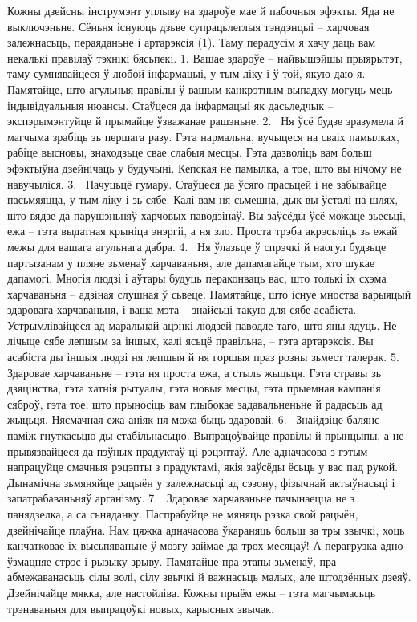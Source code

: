 Кожны дзейсны інструмэнт уплыву на здароўе мае й пабочныя эфэкты. Яда не выключэньне. Сёньня існуюць дзьве супрацьлеглыя тэндэнцыі – харчовая залежнасьць, пераяданьне і артарэксія (1). 
Таму перадусім я хачу даць вам некалькі правілаў тэхнікі бясьпекі.
1. Вашае здароўе – найвышэйшы прыярытэт, таму сумнявайцеся ў любой інфармацыі, у тым ліку і ў той, якую даю я. Памятайце, што агульныя правілы ў вашым канкрэтным выпадку могуць мець індывідуальныя нюансы. Стаўцеся да інфармацыі як дасьледчык – экспэрымэнтуйце й прымайце ўзважанае рашэньне.
2.  Ня ўсё будзе зразумела й магчыма зрабіць зь першага разу. Гэта нармальна, вучыцеся на сваіх памылках, рабіце высновы, знаходзьце свае слабыя месцы. Гэта дазволіць вам больш эфэктыўна дзейнічаць у будучыні. Кепская не памылка, а тое, што вы нічому не навучыліся.
3.  Пачуцьцё гумару. Стаўцеся да ўсяго прасьцей і не забывайце пасьмяяцца, у тым ліку і зь сябе. Калі вам ня сьмешна, дык вы ўсталі на шлях, што вядзе да парушэньняў харчовых паводзінаў. Вы заўсёды ўсё можаце зьесьці, ежа – гэта выдатная крыніца энэргіі, а ня зло. Проста трэба акрэсьліць зь ежай межы для вашага агульнага дабра.
4.  Ня ўлазьце ў спрэчкі й наогул будзьце партызанам у пляне зьменаў харчаваньня, але дапамагайце тым, хто шукае дапамогі. Многія людзі і аўтары будуць пераконваць вас, што толькі іх схэма харчаваньня – адзіная слушная ў сьвеце. Памятайце, што існуе мноства варыяцый здаровага харчаваньня, і ваша мэта – знайсьці такую для сябе асабіста. Устрымлівайцеся ад маральнай ацэнкі людзей паводле таго, што яны ядуць. Не лічыце сябе лепшым за іншых, калі ясьцё правільна, – гэта артарэксія. Вы асабіста ды іншыя людзі ня лепшыя й ня горшыя праз розны зьмест талерак.
5.  Здаровае харчаваньне – гэта ня проста ежа, а стыль жыцьця. Гэта стравы зь дзяцінства, гэта хатнія рытуалы, гэта новыя месцы, гэта прыемная кампанія сяброў, гэта тое, што прыносіць вам глыбокае задавальненьне й радасьць ад жыцьця. Нясмачная ежа аніяк ня можа быць здаровай.
6.  Знайдзіце балянс паміж гнуткасьцю ды стабільнасьцю. Выпрацоўвайце правілы й прынцыпы, а не прывязвайцеся да пэўных прадуктаў ці рэцэптаў. Але адначасова з гэтым напрацуйце смачныя рэцэпты з прадуктамі, якія заўсёды ёсьць у вас пад рукой. Дынамічна зьмяняйце рацыён у залежнасьці ад сэзону, фізычнай актыўнасьці і запатрабаваньняў арганізму.
7.  Здаровае харчаваньне пачынаецца не з панядзелка, а са сьняданку. Паспрабуйце не мяняць рэзка свой рацыён, дзейнічайце плаўна. Нам цяжка адначасова ўкараняць больш за тры звычкі, хоць канчатковае іх высьпяваньне ў мозгу займае да трох месяцаў! А перагрузка адно ўзмацняе стрэс і рызыку зрыву. Памятайце пра этапы зьменаў, пра абмежаванасьць сілы волі, сілу звычкі й важнасьць малых, але штодзённых дзеяў. Дзейнічайце мякка, але настойліва. Кожны прыём ежы – гэта магчымасьць трэнаваньня для выпрацоўкі новых, карысных звычак.
